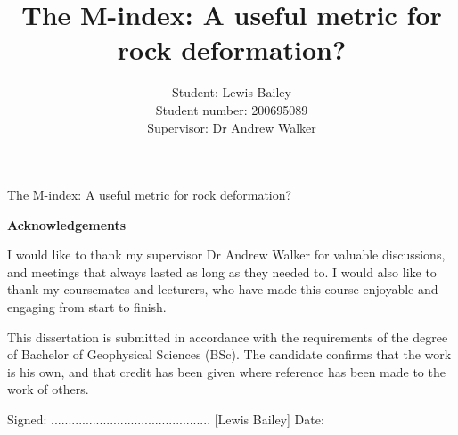 \documentclass[a4paper,12pt,twoside]{report}
\title{\textbf{The M-index: A useful metric for rock deformation?}}
\author{Student: Lewis Bailey\\Student number: 200695089\\Supervisor: Dr Andrew Walker}
\date{}
\numberwithin{equation}{chapter}
\begin{document}

%
%
%
%
%
%


\vspace{3cm}
\begin{center}
{\huge The M-index: A useful metric for rock deformation?}
\vspace{3cm}

\begin{Large}
\textbf{Acknowledgements}
\end{Large}

I would like to thank my supervisor Dr Andrew Walker for valuable discussions, and meetings that always lasted as long as they needed to. I would also like to thank my coursemates and lecturers, who have made this course enjoyable and engaging from start to finish.
  
\vspace{3cm}
\noindent
\begin{Large}
\end{Large}

This dissertation is submitted in accordance with the requirements of the degree of Bachelor of Geophysical Sciences (BSc). The candidate confirms that the work is his own, and that credit has been given where reference has been made to the work of others. 


\vspace{1cm}
\noindent
Signed: .............................................. [Lewis Bailey] Date: 

\end{center}
\end{document}
